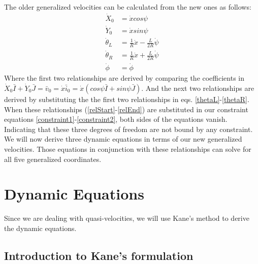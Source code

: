 \documentclass[a4paper,10pt]{article}
\begin{document}
The older generalized velocities can be calculated from the new ones as follows:
\begin{align}
 \dot{X}_0 &= \dot{x}cos\psi \label{relStart}\\
 \dot{Y}_0 &= \dot{x}sin\psi \\
 \dot\theta_L &= \frac{1}{R}\dot{x} - \frac{L}{2R}\dot{\psi} \\
 \dot\theta_R &= \frac{1}{R}\dot{x} + \frac{L}{2R}\dot{\psi} \\
 \dot\phi &= \dot\phi \label{relEnd}
\end{align}
Where the first two relationships are derived by comparing the coefficients in 
$\dot{X}_0\bar{I}+\dot{Y}_0\bar{J} = \bar{v}_0 = \dot{x}\bar{i}_0 = \dot{x}(cos\psi\bar{I}+sin\psi\bar{J})$.
And the next
two relationships are derived by substituting the the first two relationships in eqs. \ref{thetaL}-\ref{thetaR}.
When these relationships (\ref{relStart}-\ref{relEnd}) are substituted in our constraint equations \ref{constraint1}-\ref{constraint2}, both
sides of the equations vanish. Indicating that these three degrees of freedom are not bound by any constraint.
We will now derive three dynamic equations in terms of our new generalized velocities. Those equations in
conjunction with these relationships can solve for all five generalized coordinates.

\section{Dynamic Equations}
Since we are dealing with quasi-velocities, we will use Kane's method to derive the dynamic equations. 

\subsection{Introduction to Kane's formulation}
\end{document}

